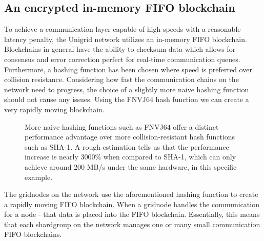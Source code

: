 \documentclass[10pt,a4paper,final]{article}
\begin{document}
\subsection{An encrypted in-memory FIFO blockchain}
\label{section:fifo}
To achieve a communication layer capable of high speeds with a reasonable latency penalty, the Unigrid network utilizes an in-memory FIFO blockchain. Blockchains in general have the ability to checksum data which allows for consensus and error correction perfect for real-time communication queues. Furthermore, a hashing function has been chosen where speed is preferred over collision resistance. Considering how fast the communication chains on the network need to progress, the choice of a slightly more naive hashing function should not cause any issues. Using the FNVJ64 hash function we can create a very rapidly moving blockchain.

\begin{figure}[H]
\centering
{}
\caption{More naive hashing functions such as FNVJ64 offer a distinct performance advantage over more collision-resistant hash functions such as SHA-1. A rough estimation tells us that the performance increase is nearly 3000\% when compared to SHA-1, which can only achieve around 200 MB/s \cite{greenrobot} under the same hardware, in this specific example.}
\end{figure}

\noindent The \glspl{gridnode} on the network use the aforementioned hashing function to create a rapidly moving FIFO blockchain. When a \gls{gridnode} handles the communication for a node - that data is placed into the FIFO blockchain. Essentially, this means that each \gls{shardgroup} on the network  manages one or many small communication FIFO blockchains.
\end{document}
